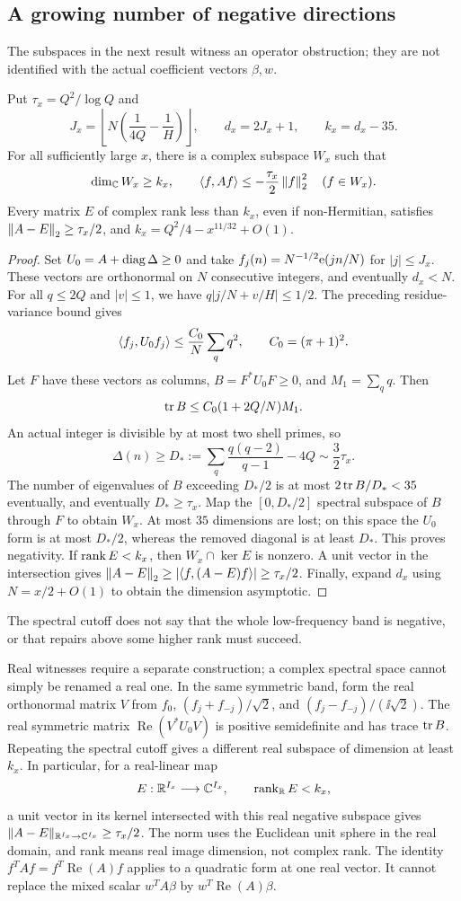 \subsection{A growing number of negative directions}
The subspaces in the next result witness an operator obstruction; they are not identified with the actual coefficient vectors $\beta,w$.
\begin{theorem}\label{thm:rank}
Put $\tau_x=Q^2/\log Q$ and
\[
J_x=\left\lfloor N\left(\frac1{4Q}-\frac1H\right)\right\rfloor,\qquad
d_x=2J_x+1,\qquad k_x=d_x-35.
\]
For all sufficiently large $x$, there is a complex subspace $W_x$ such that
\[
\dim_\mathbb C W_x\ge k_x,\qquad
\langle f,Af\rangle\le-\frac{\tau_x}{2}\left\|f\right\|_2^2\quad(f\in W_x).
\]
Every matrix $E$ of complex rank less than $k_x$, even if non-Hermitian, satisfies
$\left\|A-E\right\|_2\ge\tau_x/2$, and $k_x=Q^2/4-x^{11/32}+O(1)$.
\end{theorem}
\begin{proof}
Set $U_0=A+\operatorname{diag}\Delta\ge0$ and take $f_j(n)=N^{-1/2}\mathrm e(jn/N)$ for $|j|\le J_x$. These vectors are orthonormal on $N$ consecutive integers, and eventually $d_x<N$. For all $q\le2Q$ and $|v|\le1$, we have $q|j/N+v/H|\le1/2$. The preceding residue-variance bound gives
\[
\langle f_j,U_0f_j\rangle\le\frac{C_0}{N}\sum_q q^2,\qquad C_0=(\pi+1)^2.
\]
Let $F$ have these vectors as columns, $B=F^*U_0F\ge0$, and $M_1=\sum_q q$. Then
\[
\operatorname{tr} B\le C_0(1+2Q/N)M_1.
\]
An actual integer is divisible by at most two shell primes, so
\[
\Delta(n)\ge D_*:=\sum_q\frac{q(q-2)}{q-1}-4Q\sim\frac32\tau_x.
\]
The number of eigenvalues of $B$ exceeding $D_*/2$ is at most $2\operatorname{tr} B/D_*<35$ eventually, and eventually $D_*\ge\tau_x$. Map the $[0,D_*/2]$ spectral subspace of $B$ through $F$ to obtain $W_x$. At most $35$ dimensions are lost; on this space the $U_0$ form is at most $D_*/2$, whereas the removed diagonal is at least $D_*$. This proves negativity. If $\operatorname{rank} E<k_x$, then $W_x\cap\ker E$ is nonzero. A unit vector in the intersection gives
$\left\|A-E\right\|_2\ge|\langle f,(A-E)f\rangle|\ge\tau_x/2$.
Finally, expand $d_x$ using $N=x/2+O(1)$ to obtain the dimension asymptotic.
\end{proof}
The spectral cutoff does not say that the whole low-frequency band is negative, or that repairs above some higher rank must succeed.

Real witnesses require a separate construction; a complex spectral space cannot simply be renamed a real one. In the same symmetric band, form the real orthonormal matrix $V$ from
$f_0$, $(f_j+f_{-j})/\sqrt2$, and $(f_j-f_{-j})/(\ii\sqrt2)$.
The real symmetric matrix $\operatorname{Re}(V^*U_0V)$ is positive semidefinite and has trace $\operatorname{tr} B$. Repeating the spectral cutoff gives a different real subspace of dimension at least $k_x$. In particular, for a real-linear map
\[
E:\mathbb R^{I_x}\longrightarrow\mathbb C^{I_x},\qquad\operatorname{rank}_{\mathbb R}E<k_x,
\]
a unit vector in its kernel intersected with this real negative subspace gives
$\|A-E\|_{\mathbb R^{I_x}\to\mathbb C^{I_x}}\ge\tau_x/2$.
The norm uses the Euclidean unit sphere in the real domain, and rank means real image dimension, not complex rank. The identity
$f^TAf=f^T\operatorname{Re}(A)f$ applies to a quadratic form at one real vector. It cannot replace the mixed scalar $w^TA\beta$ by $w^T\operatorname{Re}(A)\beta$.
